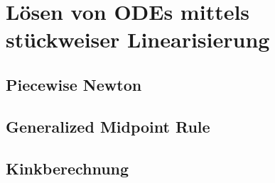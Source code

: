 % 
\chapter{Lösen von ODEs mittels stückweiser Linearisierung}
% 
\section{Piecewise Newton}

\section{Generalized Midpoint Rule}

\section{Kinkberechnung}